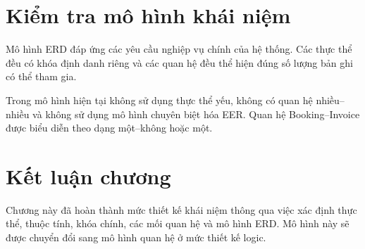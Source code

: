 \section{Kiểm tra mô hình khái niệm}

Mô hình ERD đáp ứng các yêu cầu nghiệp vụ chính của hệ thống. Các thực thể đều có khóa định danh riêng và các quan hệ đều thể hiện đúng số lượng bản ghi có thể tham gia.

Trong mô hình hiện tại không sử dụng thực thể yếu, không có quan hệ nhiều--nhiều và không sử dụng mô hình chuyên biệt hóa EER. Quan hệ Booking--Invoice được biểu diễn theo dạng một--không hoặc một.

\section{Kết luận chương}

Chương này đã hoàn thành mức thiết kế khái niệm thông qua việc xác định thực thể, thuộc tính, khóa chính, các mối quan hệ và mô hình ERD. Mô hình này sẽ được chuyển đổi sang mô hình quan hệ ở mức thiết kế logic.